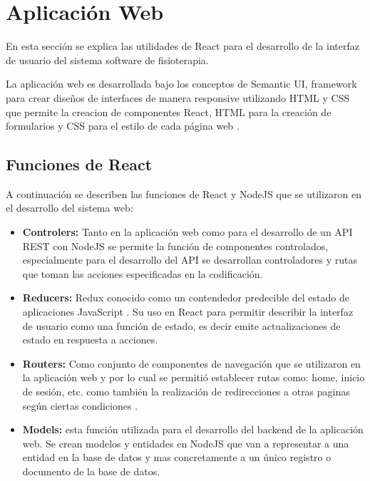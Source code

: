 \documentclass[12pt]{article}
\begin{document}








\newpage
\section{Aplicación Web}

En esta sección se explica las utilidades de React para el desarrollo de la interfaz de usuario del sistema software de fisioterapia.

La aplicación web es desarrollada bajo los conceptos de Semantic UI, framework para crear diseños de interfaces de manera responsive utilizando HTML y CSS que permite la creacion de componentes React, HTML para la creación de formularios y CSS para el estilo de cada página web \cite{33}.


\subsection{Funciones de React}

A continuación se describen las funciones de React y NodeJS que se utilizaron en el desarrollo del sistema web:

\begin{itemize}
    \item \textbf{Controlers:} Tanto en la aplicación web como para el desarrollo de un API REST con NodeJS se permite la función de componentes controlados, especialmente para el desarrollo del API se desarrollan controladores y rutas que toman las acciones especificadas en la codificación.
    \item \textbf{Reducers:} Redux conocido como un contendedor predecible del estado de aplicaciones JavaScript \cite{34}. Su uso en React para permitir describir la interfaz de usuario como una función de estado, es decir emite actualizaciones de estado en respuesta a acciones. 
    \item \textbf{Routers:} Como conjunto de componentes de navegación que se utilizaron en la aplicación web y por lo cual se permitió establecer rutas como: home, inicio de sesión, etc. como también la realización de redirecciones a otras paginas según ciertas condiciones \cite{35}.
    \item \textbf{Models:} esta función utilizada para el desarrollo del backend de la aplicación web. Se crean modelos y entidades en NodeJS que van a representar a una entidad en la base de datos y mas concretamente a un único registro o documento de la base de datos.
    
    
\end{itemize}
\end{document}
